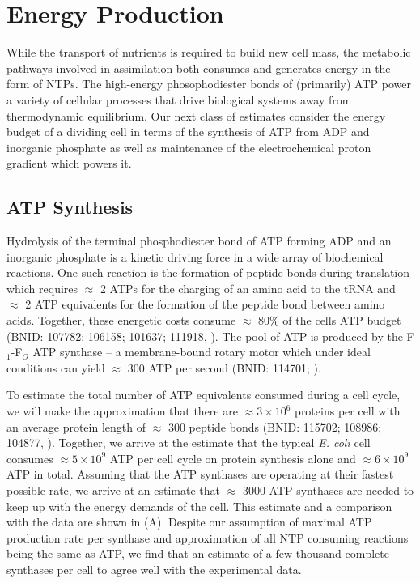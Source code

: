 \section{Energy Production}

While the transport of nutrients is required to build new cell mass, the
metabolic pathways involved in assimilation both consumes and generates energy
in the form of NTPs. The high-energy phosophodiester bonds of (primarily) ATP
power a variety of cellular processes that drive biological systems away
from thermodynamic equilibrium. Our next class of estimates consider the energy budget
of a dividing cell in terms of the synthesis of ATP from ADP and inorganic
phosphate as well as maintenance of the electrochemical proton gradient which powers it.

\subsection{ATP Synthesis}

Hydrolysis of the terminal phosphodiester bond of ATP forming ADP and an
inorganic phosphate is a kinetic driving force in a wide array of biochemical
reactions. One such reaction is the formation of peptide bonds during
translation which requires $\approx$ 2 ATPs for the charging of an amino acid
to the tRNA and $\approx$ 2 ATP equivalents for the formation of the peptide
bond between amino acids. Together, these energetic costs consume $\approx$
80\% of the cells ATP budget (BNID: 107782; 106158; 101637; 111918,
\cite{milo2010}). The pool of ATP is produced by the F$_1$-F$_O$ ATP synthase
-- a membrane-bound rotary motor which under ideal conditions can yield
$\approx$ 300 ATP per second (BNID: 114701; \cite{milo2010, weber2003}).

To estimate the total number of ATP equivalents consumed during a cell cycle, we
will make the approximation that there are $\approx 3\times10^6$ proteins per
cell with an average protein length of $\approx$ 300 peptide bonds (BNID:
115702; 108986; 104877, \cite{milo2010}). Together, we
arrive at the estimate that the typical \textit{E. coli} cell consumes $\approx
5 \times 10^9$ ATP per cell cycle on protein synthesis alone and $\approx
6\times 10^9$ ATP in total. Assuming that the ATP synthases are operating at
their fastest possible rate, we arrive at an estimate that $\approx$ 3000  ATP
synthases are needed to keep up with the energy demands of the cell. This
estimate and a comparison with the data are shown in (A).
Despite our assumption of maximal ATP production rate per synthase and
approximation of all NTP consuming reactions being the same as ATP, we find that
an estimate of a few thousand complete synthases per cell to agree well with the
experimental data.

